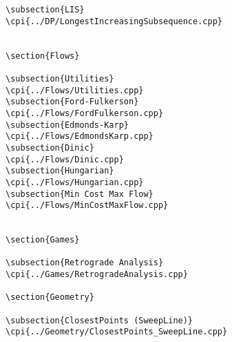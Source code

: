 {\begin{verbatim}
\subsection{LIS}
\cpi{../DP/LongestIncreasingSubsequence.cpp}


\section{Flows}

\subsection{Utilities}
\cpi{../Flows/Utilities.cpp}
\subsection{Ford-Fulkerson}
\cpi{../Flows/FordFulkerson.cpp}
\subsection{Edmonds-Karp}
\cpi{../Flows/EdmondsKarp.cpp}
\subsection{Dinic}
\cpi{../Flows/Dinic.cpp}
\subsection{Hungarian}
\cpi{../Flows/Hungarian.cpp}
\subsection{Min Cost Max Flow}
\cpi{../Flows/MinCostMaxFlow.cpp}


\section{Games}

\subsection{Retrograde Analysis}
\cpi{../Games/RetrogradeAnalysis.cpp}

\section{Geometry}

\subsection{ClosestPoints (SweepLine)}
\cpi{../Geometry/ClosestPoints_SweepLine.cpp}

\end{verbatim}}
